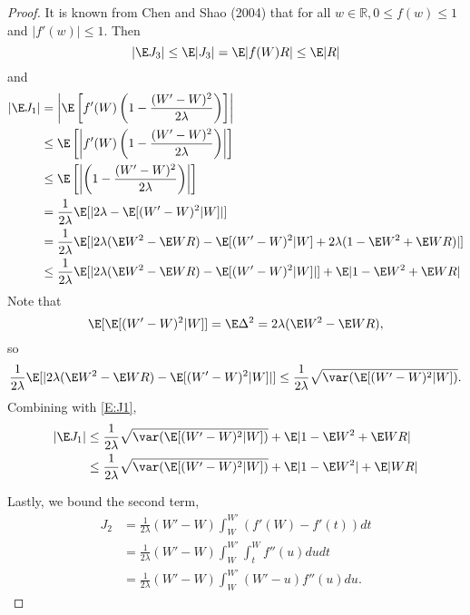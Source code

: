 \begin{proof}
  It is known from Chen and Shao (2004) that for all $w \in \mathbb{R}, 0 \leq f(w) \leq 1$ and
  $|f'(w)| \leq 1$.  Then
  \begin{equation}
    |\E J_3| \leq \E |J_3| = \E |f(W)R| \leq \E |R|
  \end{equation}
  and
  \begin{equation}
    \label{E:J1}
    \begin{split}
      |\E J_1 | &= \left | \E \left [f'(W)\left (1-\frac{(W'-W)^2}{2\lambda} \right ) \right ]
      \right | \\
      &\leq \E \left [\left | f'(W)\left (1-\frac{(W'-W)^2}{2\lambda} \right ) \right | \right ] \\
      &\leq \E \left [ \left | \left (1-\frac{(W'-W)^2}{2\lambda} \right )  \right | \right ] \\
      &= \frac{1}{2\lambda} \E [|2\lambda - \E [(W'-W)^2|W]|] \\
      &= \frac{1}{2\lambda} \E [|2\lambda (\E W^2 - \E WR) - \E [(W'-W)^2|W] +
      2\lambda (1 - \E W^2 + \E WR)|] \\
      &\leq \frac{1}{2\lambda} \E [|2\lambda (\E W^2 - \E WR) - \E [(W'-W)^2|W]|] +
      \E |1 - \E W^2 + \E WR|
    \end{split}
  \end{equation}
  Note that
  \begin{equation}
    \E [\E [(W'-W)^2|W]] = \E \Delta^2 = 2 \lambda (\E W^2 - \E WR),
  \end{equation}
  so
  \begin{equation}
    \frac{1}{2\lambda} \E [|2\lambda (\E W^2 - \E WR) - \E [(W'-W)^2|W]|] \leq
    \frac{1}{2\lambda} \sqrt{\var (\E [(W'-W)^2|W])}.
  \end{equation}
  Combining with \eqref{E:J1},
  \begin{equation}
    \begin{split}
      |\E J_1 | &\leq \frac{1}{2\lambda} \sqrt{\var (\E [(W'-W)^2|W])} +
      \E |1 - \E W^2 + \E WR| \\
      &\leq \frac{1}{2\lambda} \sqrt{\var (\E [(W'-W)^2|W])} + \E |1 - \E W^2| + \E |WR| \\
    \end{split}
  \end{equation}

  Lastly, we bound the second term,
  \begin{equation}
    \begin{split}
      J_2 &= \frac{1}{2 \lambda}(W'-W)\int_W^{W'} (f'(W)-f'(t)) dt \\
      &= \frac{1}{2 \lambda}(W'-W)\int_W^{W'}\int_t^Wf''(u) du dt \\
      &= \frac{1}{2 \lambda}(W'-W)\int_W^{W'} (W'-u)f''(u) du.
    \end{split}
  \end{equation}


\end{proof}
